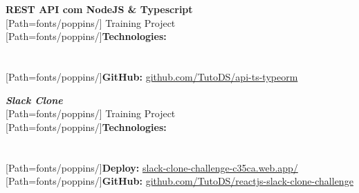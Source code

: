 \begin{minipage}{.5\textwidth}
\textbf{REST API com NodeJS \& Typescript}\\[3pt]
{
	\scriptsize
	[Path=fonts/poppins/]
	Training Project\\[2pt]

	{[Path=fonts/poppins/]\textbf{Technologies:}}\\
	   \\[1pt]   \\[2pt]

	{[Path=fonts/poppins/]\textbf{GitHub:}} \href{https://github.com/TutoDS/api-ts-typeorm}{github.com/TutoDS/api-ts-typeorm}
}
\end{minipage}
\begin{minipage}{.5\textwidth}
	\textbf{\textit{Slack Clone}}\\[3pt]
	{
		\scriptsize
		[Path=fonts/poppins/]
		Training Project\\[2pt]

		{[Path=fonts/poppins/]\textbf{Technologies:}}\\
		  \\ \\[2pt]

		{[Path=fonts/poppins/]\textbf{Deploy:}} \href{https://slack-clone-challenge-c35ca.web.app/}{slack-clone-challenge-c35ca.web.app/}\\
		{[Path=fonts/poppins/]\textbf{GitHub:}} \href{https://github.com/TutoDS/reactjs-slack-clone-challenge}{github.com/TutoDS/reactjs-slack-clone-challenge}
	}
\end{minipage}

\vspace{10pt}

